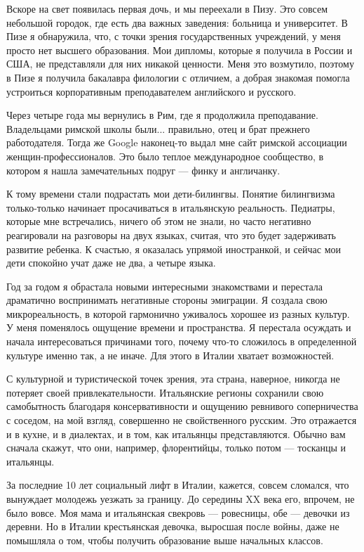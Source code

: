 Вскоре на свет появилась первая дочь, и мы переехали в Пизу. Это совсем небольшой городок, где есть два важных заведения: больница и университет. В Пизе я обнаружила, что, с точки зрения государственных учреждений, у меня просто нет высшего образования. Мои дипломы, которые я получила в России и США, не представляли для них никакой ценности. Меня это возмутило, поэтому в Пизе я получила бакалавра филологии с отличием, а добрая знакомая помогла устроиться корпоративным преподавателем английского и русского.

Через четыре года мы вернулись в Рим, где я продолжила преподавание. Владельцами римской школы были... правильно, отец и брат прежнего работодателя. Тогда же Google наконец-то выдал мне сайт римской ассоциации женщин-профессионалов. Это было теплое международное сообщество, в котором я нашла замечательных подруг — финку и англичанку.

К тому времени стали подрастать мои дети-билингвы. Понятие билингвизма только-только начинает просачиваться в итальянскую реальность. Педиатры, которые мне встречались, ничего об этом не знали, но часто негативно реагировали на разговоры на двух языках, считая, что это будет задерживать развитие ребенка. К счастью, я оказалась упрямой иностранкой, и сейчас мои дети спокойно учат даже не два, а четыре языка.

Год за годом я обрастала новыми интересными знакомствами и перестала драматично воспринимать негативные стороны эмиграции. Я создала свою микрореальность, в которой гармонично уживалось хорошее из разных культур. У меня поменялось ощущение времени и пространства. Я перестала осуждать и начала интересоваться причинами того, почему что-то сложилось в определенной культуре именно так, а не иначе. Для этого в Италии хватает возможностей.

С культурной и туристической точек зрения, эта страна, наверное, никогда не потеряет своей привлекательности. Итальянские регионы сохранили свою самобытность благодаря консервативности и ощущению ревнивого соперничества с соседом, на мой взгляд, совершенно не свойственного русским. Это отражается и в кухне, и в диалектах, и в том, как итальянцы представляются. Обычно вам сначала скажут, что они, например, флорентийцы, только потом — тосканцы и итальянцы.

За последние 10 лет социальный лифт в Италии, кажется, совсем сломался, что вынуждает молодежь уезжать за границу. До середины XX века его, впрочем, не было вовсе. Моя мама и итальянская свекровь — ровесницы, обе — девочки из деревни. Но в Италии крестьянская девочка, выросшая после войны, даже не помышляла о том, чтобы получить образование выше начальных классов.


